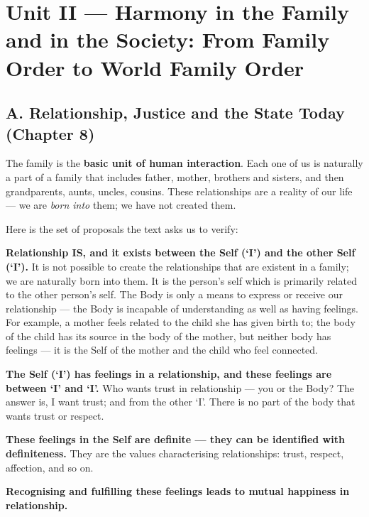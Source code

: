 \chapter{Unit II --- Harmony in the Family and in the Society: From Family
  Order to World Family Order}

\section{A. Relationship, Justice and the State Today (Chapter 8)}


\ans The family is the \textbf{basic unit of human interaction}. Each one of
us is naturally a part of a family that includes father, mother, brothers and
sisters, and then grandparents, aunts, uncles, cousins. These relationships
are a reality of our life --- we are \emph{born into} them; we have not
created them.

Here is the set of proposals the text asks us to verify:

\begin{apts}
\item \textbf{Relationship IS, and it exists between the Self (`I') and the
      other Self (`I').} It is not possible to create the relationships that
      are existent in a family; we are naturally born into them. It is the
      person's self which is primarily related to the other person's self. The
      Body is only a means to express or receive our relationship --- the Body
      is incapable of understanding as well as having feelings. For example, a
      mother feels related to the child she has given birth to; the body of
      the child has its source in the body of the mother, but neither body has
      feelings --- it is the Self of the mother and the child who feel
      connected.
\item \textbf{The Self (`I') has feelings in a relationship, and these
      feelings are between `I' and `I'.} Who wants trust in relationship ---
      you or the Body? The answer is, I want trust; and from the other `I'.
      There is no part of the body that wants trust or respect.
\item \textbf{These feelings in the Self are definite --- they can be
      identified with definiteness.} They are the values characterising
      relationships: trust, respect, affection, and so on.
\item \textbf{Recognising and fulfilling these feelings leads to mutual
      happiness in relationship.}
\end{apts}

